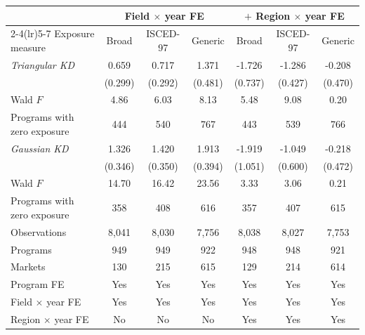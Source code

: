 \begin{tabular}{lcccccc}
\toprule
 & \multicolumn{3}{c}{Field \(\times\) year FE} & \multicolumn{3}{c}{\(+\) Region \(\times\) year FE} \\
\cmidrule(lr){2-4}\cmidrule(lr){5-7}
Exposure measure & Broad & ISCED-97 & Generic & Broad & ISCED-97 & Generic \\
\midrule
\textit{Triangular KD} &  0.659\sym{**} &  0.717\sym{**} &  1.371\sym{***} & -1.726\sym{**} & -1.286\sym{***} & -0.208 \\
 & (0.299) & (0.292) & (0.481) & (0.737) & (0.427) & (0.470) \\
\quad Wald \(F\) &  4.86 &  6.03 &  8.13 &  5.48 &  9.08 &  0.20 \\
\quad Programs with zero exposure &       444 &       540 &       767 &       443 &       539 &       766 \\
\addlinespace
\textit{Gaussian KD} &  1.326\sym{***} &  1.420\sym{***} &  1.913\sym{***} & -1.919\sym{*} & -1.049\sym{*} & -0.218 \\
 & (0.346) & (0.350) & (0.394) & (1.051) & (0.600) & (0.472) \\
\quad Wald \(F\) & 14.70 & 16.42 & 23.56 &  3.33 &  3.06 &  0.21 \\
\quad Programs with zero exposure &       358 &       408 &       616 &       357 &       407 &       615 \\
\midrule
Observations &     8,041 &     8,030 &     7,756 &     8,038 &     8,027 &     7,753 \\
Programs &       949 &       949 &       922 &       948 &       948 &       921 \\
Markets &       130 &       215 &       615 &       129 &       214 &       614 \\
Program FE & Yes & Yes & Yes & Yes & Yes & Yes \\
Field \(\times\) year FE & Yes & Yes & Yes & Yes & Yes & Yes \\
Region \(\times\) year FE & No & No & No & Yes & Yes & Yes \\
\bottomrule
\end{tabular}
